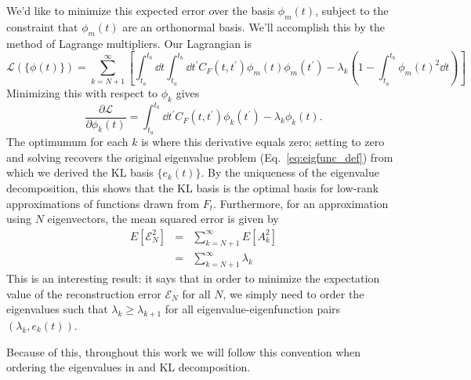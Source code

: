We'd like to minimize this expected error over the basis $\phi_m(t)$, subject
to the constraint that $\phi_m(t)$ are an orthonormal basis.  We'll accomplish
this by the method of Lagrange multipliers.  Our Lagrangian is
\begin{equation}
  \mathcal{L}(\{\phi(t)\}) = \sum_{k=N+1}^\infty
  \left[\int_{t_a}^{t_b} \dd t \int_{t_a}^{t_b} \dd t^\prime
  C_F(t, t^\prime) \phi_m(t)\phi_m(t^\prime)
  - \lambda_k\left(1 - \int_{t_a}^{t_b} \phi_m(t)^2 \dd t\right)
  \right]
\end{equation}
Minimizing this with respect to $\phi_k$ gives
\begin{equation}
  \frac{\partial\mathcal{L}}{\partial\phi_k(t)} = \int_{t_a}^{t_b} \dd t^\prime
  C_F(t, t^\prime) \phi_k(t^\prime)
  - \lambda_k \phi_k(t).
\end{equation}
The optimumum for each $k$ is where this derivative equals zero; setting to
zero and solving recovers the original eigenvalue problem
 (Eq.~\ref{eq:eigfunc_def}) from which we
derived the KL basis $\{e_k(t)\}$.  By the uniqueness of the eigenvalue
decomposition, this shows that the KL basis is the optimal basis for low-rank
approximations of functions drawn from $F_t$.  Furthermore, for an
approximation using $N$ eigenvectors, the mean squared error is given by
\begin{eqnarray}
  E[\mathcal{E}^2_N] &=& \sum_{k=N+1}^\infty E[A_k^2]\nonumber\\
  &=& \sum_{k=N+1}^\infty \lambda_k
\end{eqnarray}
This is an interesting result: it says that in order to minimize the
expectation value of the reconstruction error $\mathcal{E}_N$ for all $N$,
we simply need to order the eigenvalues such that $\lambda_k \ge \lambda_{k+1}$
for all eigenvalue-eigenfunction pairs $(\lambda_k, e_k(t))$.

Because of this, throughout this work we will follow this convention when
ordering the eigenvalues in and KL decomposition.

